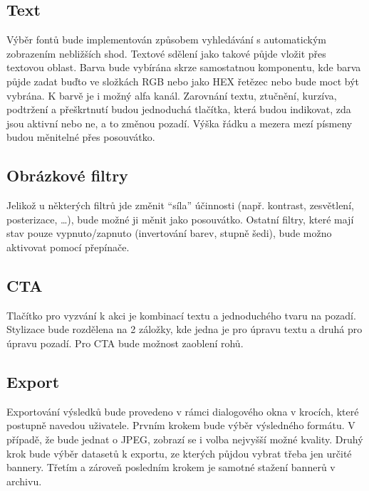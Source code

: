         \subsection{Text}
        Výběr fontů bude implementován způsobem vyhledávání s automatickým zobrazením nebližších shod.
        Textové sdělení jako takové půjde vložit přes textovou oblast. Barva bude vybírána skrze samostatnou komponentu, kde barva půjde zadat buďto
        ve složkách RGB nebo jako HEX řetězec nebo bude moct být vybrána. K barvě je i možný alfa kanál.
        Zarovnání textu, ztučnění, kurzíva, podtržení a přeškrtnutí budou jednoduchá tlačítka, která budou indikovat, zda jsou aktivní nebo ne,
        a to změnou pozadí. Výška řádku a mezera mezí písmeny budou měnitelné přes posouvátko.

        \subsection{Obrázkové filtry}
        Jelikož u některých filtrů jde změnit \enquote{síla} účinnosti (např. kontrast, zesvětlení, posterizace, \ldots), bude možné ji měnit jako posouvátko.
        Ostatní filtry, které mají stav pouze vypnuto/zapnuto (invertování barev, stupně šedi), bude možno aktivovat pomocí přepínače.

        \subsection{CTA}
        Tlačítko pro vyzvání k akci je kombinací textu a jednoduchého tvaru na pozadí. Stylizace bude rozdělena na 2 záložky, kde jedna je pro úpravu textu a
        druhá pro úpravu pozadí. Pro CTA bude možnost zaoblení rohů.

        \subsection{Export}
        Exportování výsledků bude provedeno v rámci dialogového okna v krocích, které postupně navedou uživatele.
        Prvním krokem bude výběr výsledného formátu. V případě, že bude jednat o JPEG, zobrazí se i volba nejvyšší možné kvality.
        Druhý krok bude výběr datasetů k exportu, ze kterých půjdou vybrat třeba jen určité bannery. Třetím a zároveň posledním krokem je
        samotné stažení bannerů v archivu. 

\endinput